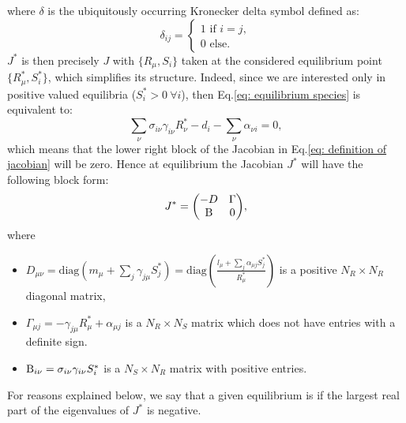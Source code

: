 \documentclass[12pt, titlepage]{report}
\begin{document}
where $\delta$ is the ubiquitously occurring Kronecker delta symbol defined as:
\begin{equation}
\delta_{ij} =
\begin{cases}
1 \text{ if }i=j, \\
0 \text{ else.}
\end{cases}
\end{equation}
$J^*$ is then precisely $J$  with $\{R_\mu, S_i\}$ taken at the considered equilibrium point $\{R_\mu^*, S_i^*\}$, which simplifies its structure. Indeed,
since we are interested only in positive valued equilibria (\ie $S^*_i > 0 \ \forall i$), then Eq.\eqref{eq: equilibrium species} is equivalent to:
\begin{equation}
  \sum_\nu \sigma_{i\nu} \gamma_{i\nu}R^*_\nu -d_i - \sum_\nu \alpha_{\nu i} = 0,
\end{equation}
which means that the lower right block of the Jacobian in Eq.\eqref{eq: definition of jacobian} will be zero. Hence at equilibrium the Jacobian $J^*$ will have the following block form:
\begin{equation}
{
  J^* = \begin{pmatrix}
  -D & \Gamma \\
  \text{B}& 0
\end{pmatrix}
}, \label{eq: jacobian at equilibrium}
\end{equation}
where
\begin{itemize}
  \item $D_{\mu\nu} = \text{diag}(m_\mu+\sum_j \gamma_{j\mu} S^*_j) = \text{diag}\left(\frac{l_\mu + \sum_j \alpha_{\mu j}S_j^*}{R^*_\mu}\right)$ is a positive $N_R \times N_R$ diagonal matrix,
  \item $\Gamma_{\mu j} = -\gamma_{j\mu}R^*_\mu + \alpha_{\mu j}$ is a $N_R \times N_S$ matrix which does not have entries with a definite sign.
  \item $\text{B}_{i\nu} = \sigma_{i\nu} \gamma_{i\nu} S^*_i$ is a $N_S \times N_R$ matrix with positive entries.
\end{itemize}
For reasons explained below, we say that a given equilibrium is  if the largest real part of the eigenvalues of $J^*$ is negative.
\end{document}
